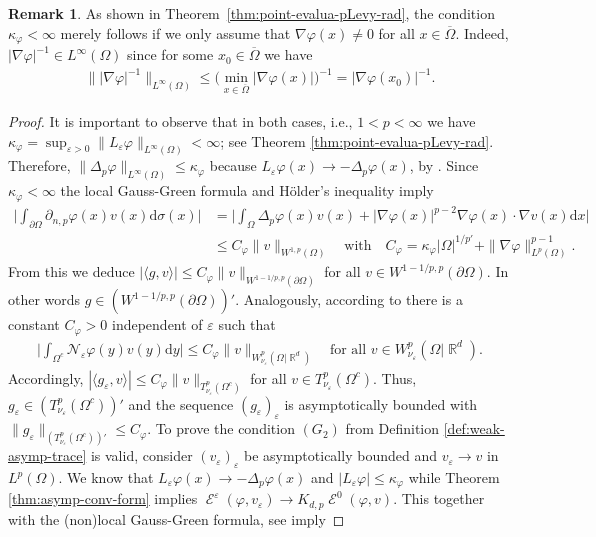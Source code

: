 \documentclass[12pt, reqno]{amsart}%
\theoremstyle{plain}  %
\theoremstyle{definition}  %
\newtheorem{remark}[theorem]{Remark}   %
\numberwithin{equation}{section}
\DeclareMathOperator{\cE}{\mathcal{E}}
\DeclareMathOperator{\R}{\mathbb{R}}
\renewcommand{\d}{\mathrm{d}}
\newcommand{\eps}{\varepsilon}
\newcommand{\WnuOmRa}{W^p_{\nu_\eps}(\Omega|\R^d )}
\newcommand{\TnuOma}{T^p_{\nu_\eps} (\Omega^c)}
\begin{document}
\begin{remark}
As shown in Theorem~\ref{thm:point-evalua-pLevy-rad}, the condition
$\kappa_\varphi < \infty$ merely follows if we only assume that
$\nabla \varphi(x) \neq 0$ for all $x \in \overline{\Omega}$.
Indeed,  $|\nabla \varphi|^{-1} \in L^\infty(\Omega)$ since for some $x_0 \in \overline{\Omega}$ we have
\begin{align*}
    \big\| |\nabla \varphi|^{-1} \big\|_{L^\infty(\Omega)}
    \leq \Big( \min_{x \in \overline{\Omega}} |\nabla \varphi(x)| \Big)^{-1}
    = |\nabla \varphi(x_0)|^{-1}.
\end{align*}
\end{remark}

\begin{proof}
It is important to observe that  in both cases, i.e., $1<p<\infty$ we have $\kappa_\varphi=\sup_{\eps>0}\|L_\eps \varphi\|_{L^\infty(\Omega)} <\infty$; see Theorem \ref{thm:point-evalua-pLevy-rad}. Therefore, $\|\Delta_p  \varphi\|_{L^\infty(\Omega)} \leq \kappa_\varphi$ because  $L_\eps \varphi (x)\to -\Delta_p\varphi(x)$, by \cite[Theorem 9.9]{Fog25}.
Since  $\kappa_\varphi<\infty$ the local Gauss-Green formula and H{\"o}lder's inequality imply
\begin{align*}
\Big|\int_{\partial \Omega}\partial_{n,p} \varphi (x)v(x)\d \sigma(x)\Big|&= \Big|\int_{\Omega} \Delta_p \varphi(x) v(x)+|\nabla \varphi(x)|^{p-2} \nabla \varphi(x) \cdot \nabla v(x)\d x\Big|
\\& \leq C_\varphi \|v\|_{W^{1,p}(\Omega)}\quad \text{with}\quad C_\varphi= \kappa_\varphi|\Omega|^{1/p'}+ \|\nabla\varphi\|^{p-1}_{L^p(\Omega)}.
\end{align*}
From this we deduce $|\langle g, v \rangle|\leq C_\varphi\|v\|_{W^{1-1/p ,p}(\partial \Omega)}$ for all $v\in W^{1-1/p ,p}(\partial \Omega)$. In other words $g\in (W^{1-1/p ,p}(\partial \Omega))'$.  Analogously,   according to \cite[Lemma 11.1]{Fog25} there is a constant $C_\varphi>0$ independent of $\eps$ such that
\begin{align*}
\Big|\int_{\Omega^c} \mathcal{N}_\eps \varphi(y)v(y)\d y\Big|\leq C_\varphi\|v\|_{W^p_{\nu_\eps}(\Omega|\R^d)} \quad\text{for all $v\in \WnuOmRa$}.
\end{align*}
Accordingly, $|\langle g_\eps, v \rangle|\leq C_\varphi\|v\|_{\TnuOma}$ for all $v\in \TnuOma$. Thus,  $g_\eps\in (\TnuOma)'$ and  the sequence $(g_\eps)_\eps$ is asymptotically bounded with  $\|g_\eps\|_{(\TnuOma)'}\leq C_\varphi$. To prove the condition $(G_2)$ from Definition \ref{def:weak-asymp-trace} is valid, consider $(v_\eps)_\eps$ be asymptotically bounded  and $v_\eps\to v$ in $L^p(\Omega)$. We know that $L_\eps \varphi (x)\to -\Delta_p\varphi(x)$ and $|L_\eps\varphi | \leq \kappa_\varphi$ while Theorem \ref{thm:asymp-conv-form} implies $\cE^{\eps}(\varphi, v_\eps)\to K_{d,p}\cE^0(\varphi, v)$. This together with the (non)local Gauss-Green formula, see \cite[Theorem B.8]{Fog25} imply


\end{proof}
\end{document}
